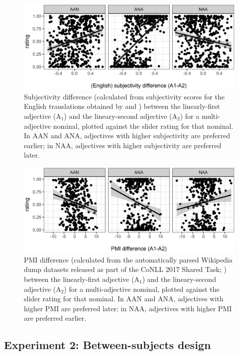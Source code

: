 \documentclass[11pt]{article}
\begin{document}
\begin{figure}[h]
	\centering
	\includegraphics[width=.82\textwidth]{subjectivity.eps}
	\caption{Subjectivity difference (calculated from subjectivity scores for the English translations obtained by \citealp{futrelletal2020} and \citealp{dyeretal2023}) between the linearly-first adjective (A$_1$) and the lineary-second adjective (A$_2$) for a multi-adjective nominal, plotted against the slider rating for that nominal. In AAN and ANA, adjectives with higher subjectivity are preferred earlier; in NAA, adjectives with higher subjectivity are preferred later.}
	\label{subjectivity}
\end{figure}


\begin{figure}[h]
	\centering
	\includegraphics[width=.82\textwidth]{PMI.eps}
	\caption{PMI difference (calculated from the automatically parsed Wikipedia dump datasets released as part of the CoNLL 2017 Shared Task; \citealp{zemanetal2017}) between the linearly-first adjective (A$_1$) and the lineary-second adjective (A$_2$) for a multi-adjective nominal, plotted against the slider rating for that nominal. In AAN and ANA, adjectives with higher PMI are preferred later; in NAA, adjectives with higher PMI are preferred earlier.}
	\label{PMI}
\end{figure}




\subsection{Experiment 2: Between-subjects design}
\end{document}
